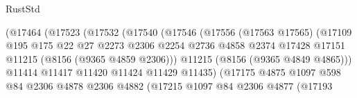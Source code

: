 \begin{lexlean}{RustStd}
\begin{coremodule}
                                        (@17464
                                          (@17523
                                            (@17532
                                              (@17540
                                                (@17546
                                                  (@17556
                                                    (@17563 @17565)
                                                    (@17109
                                                      @195
                                                      @175
                                                      @22
                                                      @27
                                                      @2273
                                                      @2306
                                                      @2254
                                                      @2736
                                                      @4858
                                                      @2374
                                                      @17428
                                                      @17151
                                                      @11215
                                                      (@8156 (@9365 @4859 @2306)))
                                                    @11215
                                                    (@8156 (@9365 @4849 @4865)))
                                                  @11414
                                                  @11417
                                                  @11420
                                                  @11424
                                                  @11429
                                                  @11435)
                                                (@17175
                                                  @4875
                                                  @1097
                                                  @598
                                                  @84
                                                  @2306
                                                  @4878
                                                  @2306
                                                  @4882
                                                  (@17215
                                                    @1097
                                                    @84
                                                    @2306
                                                    @4877
                                                    (@17193

\end{coremodule}
\end{lexlean}

